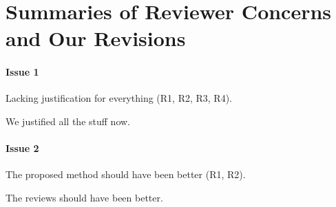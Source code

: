 
\section{Summaries of Reviewer Concerns and Our Revisions} \label{sec:concerns}

\paragraph{Issue 1}
Lacking justification for everything (R1, R2, R3, R4). 

\begin{response} \label{res:concerns:is1}
We justified all the stuff now.
\end{response}


\paragraph{Issue 2}
The proposed method should have been better (R1, R2).

\begin{response} \label{res:concerns:is}
The reviews should have been better.
\end{response}


